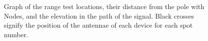 \begin{figure}[H]
    \centering
    \subfloat[SF11-FAR1]{} \hfil
    \subfloat[SF11-FAR2]{}
    \caption{\label{fig:range-elevation-far}Graph of the range test locations, their distance from the pole with Nodes, and the elevation in the path of the signal. Black crosses signify the position of the antennae of each device for each spot number.}
\end{figure}